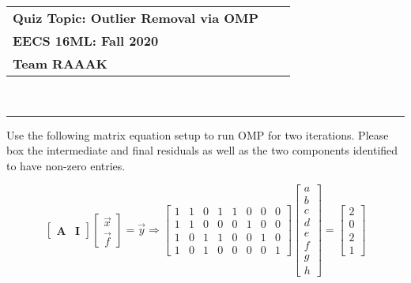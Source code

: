 \documentclass[11pt,letterpaper]{article}
\makeatletter
\newcommand{\class}{EECS 16ML}
\newcommand{\term}{Fall 2020}
\newcommand{\instructor}{Team RAAAK}
\newcommand{\head}[2]{%
\thispagestyle{empty}
\vspace*{-0.5in}
\noindent\begin{tabular*}{\textwidth}{l @{\extracolsep{\fill}} r @{\extracolsep{6pt}} l}
	\textbf{Quiz Topic: Outlier Removal via OMP} \\
	\textbf{\class:\; \term} & & \\
	\textbf{\instructor}
\end{tabular*} \\
\rule[2ex]{\textwidth}{2pt} %
}
\newcounter{problem}
\newcommand{\problem}{
	\stepcounter{problem}%
	\noindent \textbf{Problem \theproblem. }%
}
\makeatother
\begin{document}
\head{}

\problem Use the following matrix equation setup to run OMP for two iterations. Please box the intermediate and final residuals as well as the two components identified to have non-zero entries.

\begin{equation*}
    \begin{bmatrix}
        \boldsymbol{A} & \boldsymbol{I}
    \end{bmatrix}\begin{bmatrix}
        \vec{x} \\
        \vec{f}
    \end{bmatrix}
     = \vec{y} \Rightarrow
    \begin{bmatrix}
         1 & 1 & 0 & 1 & 1 & 0 & 0 & 0 \\
         1 & 1 & 0 & 0 & 0 & 1 & 0 & 0 \\
         1 & 0 & 1 & 1 & 0 & 0 & 1 & 0 \\
         1 & 0 & 1 & 0 & 0 & 0 & 0 & 1
    \end{bmatrix}
    \begin{bmatrix}
         a \\ b \\ c \\ d \\ e \\ f \\ g \\ h
    \end{bmatrix}
    =\begin{bmatrix}
         2 \\ 0 \\ 2 \\ 1
    \end{bmatrix}
\end{equation*}
\end{document}
